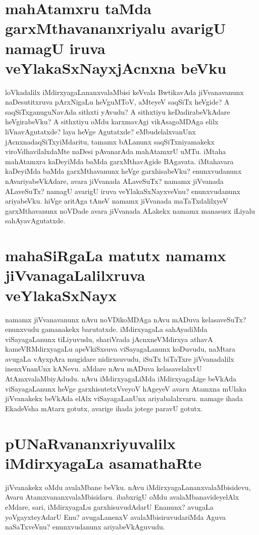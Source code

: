 \section*{mahAtamxru taMda garxMthavananxriyalu avarigU namagU iruva veYlakaSxNayxjAcnxna beVku}

loVkadalilx iMdirxyagaLananxvalaMbisi keVvala BwtikavAda jiVvanavanunx naDesutitxruva pArxNigaLu heVguMToV, aMteyeV saqSiTx heVgide? A saqSiTxganuguNavAda sithxti yAvudu? A sithxtiyu keDadirabeVkAdare heVgirabeVku? A sithxtiyu oMdu karxmavAgi vikAsagoMDAga elilx liVnavAgutatxde? laya heVge Agutatxde? eMbudelalxvanUnx jAcnxnadaqSiTxyiMdaritu, tamamx bALanunx saqSiTxniyamakekx viroVdhavilalxdaMte naDesi pAvanarAda mahAtamxrU uMTu. iMtaha mahAtamxra kaDeyiMda baMda garxMthavAgide BAgavata. iMtahavara kaDeyiMda baMda garxMthavanunx heVge garxhisabeVku? enunxvudanunx nAvariyabeVkAdare, avara jiVvanada ALaveSuTx? namamx jiVvanada ALaveSuTx? namagU avarigU iruva veYlakaSxNayxveVnu? enunxvudanunx ariyabeVku. hiVge aritAga tAneV namamx jiVvanada maTaTxdalilxyeV garxMthavanunx noVDade avara jiVvanada ALakekx namamx manasusx iLiyalu sahAyavAgutatxde. 

\section*{mahaSiRgaLa matutx namamx jiVvanagaLalilxruva veYlakaSxNayx }

namamx jiVvanavanunx nAvu noVDikoMDAga nAvu mADuva kelasaveSuTx? enunxvudu gamanakekx  barutatxde. iMdirxyagaLa sahAyadiMda viSayagaLanunx tiLiyuvudu, shariVrada jAcnxneVMdirxya athavA kameVRMdirxyagaLu apeVkiSxsuva viSayagaLanunx koDuvudu, naMtara avugaLa vAyxpAra mugidare nidirxsuvudu, iSuTx biTaTxre jiVvanadalilx inenxVnanUnx kANevu. aMdare nAvu mADuva kelasavelalxvU AtAmxvalaMbiyAdudu. nAvu iMdirxyagaLiMda iMdirxyagaLige beVkAda viSayagaLanunx heVge garxhisutetxVveyoV hAgeyeV avaru Atamxna mUlaka jiVvanakekx beVkAda elAlx viSayagaLanUnx ariyabalalxvaru. namage ihada EkadeVsha mAtarx gotutx, avarige ihada jotege paravU gotutx. 

\section*{pUNaRvananxriyuvalilx iMdirxyagaLa asamathaRte}

jiVvanakekx oMdu avalaMbane beVku. nAvu iMdirxyagaLananxvalaMbisidevu, Avaru AtamxvananxvalaMbisidaru. ibabxrigU oMdu avalaMbanavideyelAlx eMdare, sari, iMdirxyagaLu garxhisuvudAdarU Enanunx? avugaLa yoVgayxteyAdarU Enu? avugaLanenxV avalaMbisiruvudariMda Aguva naSaTxveVnu? enunxvudanunx ariyabeVkAguvudu.

